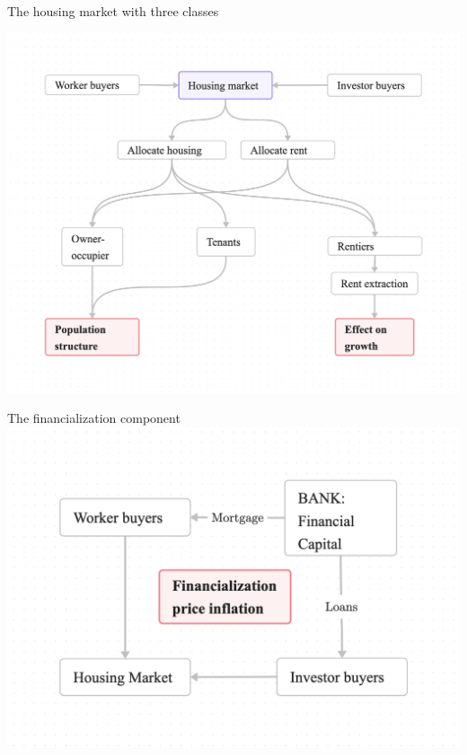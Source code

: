 \documentclass[notes=show]{beamer} %
\begin{document}
\begin{frame}{The housing market with three classes}
\begin{center}
 \vspace{-.5cm}   
\includegraphics[scale=.14,trim={.5cm 1cm 0 1.5cm},clip]{fig/flow-impacts.png}
\end{center}

\end{frame}

\begin{frame}{The financialization component}
\centering
\includegraphics[scale=.175]{fig/flow-financialization.png}
\end{frame}
\end{document}
